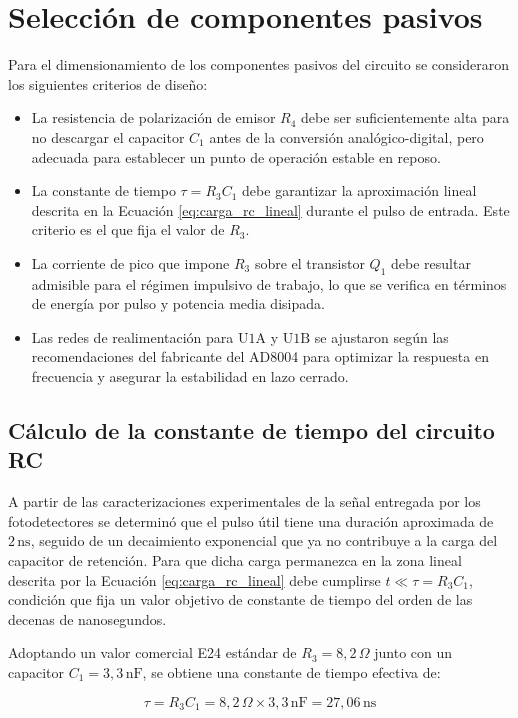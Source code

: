 \section{Selección de componentes pasivos}

Para el dimensionamiento de los componentes pasivos del circuito se consideraron los siguientes criterios de diseño:
\begin{itemize}
  \item La resistencia de polarización de emisor $R_4$ debe ser suficientemente alta para no descargar el capacitor $C_1$ antes de la conversión analógico-digital, pero adecuada para establecer un punto de operación estable en reposo.
  \item La constante de tiempo $\tau = R_3 C_1$ debe garantizar la aproximación lineal descrita en la Ecuación \ref{eq:carga_rc_lineal} durante el pulso de entrada. Este criterio es el que fija el valor de $R_3$.
  \item La corriente de pico que impone $R_3$ sobre el transistor $Q_1$ debe resultar admisible para el régimen impulsivo de trabajo, lo que se verifica en términos de energía por pulso y potencia media disipada.
  \item Las redes de realimentación para $\text{U1A}$ y $\text{U1B}$ se ajustaron según las recomendaciones del fabricante del AD8004 para optimizar la respuesta en frecuencia y asegurar la estabilidad en lazo cerrado.
\end{itemize}

\subsection{Cálculo de la constante de tiempo del circuito RC}

A partir de las caracterizaciones experimentales de la señal entregada por los fotodetectores se determinó que el pulso útil tiene una duración aproximada de $2\,\text{ns}$, seguido de un decaimiento exponencial que ya no contribuye a la carga del capacitor de retención. Para que dicha carga permanezca en la zona lineal descrita por la Ecuación \ref{eq:carga_rc_lineal} debe cumplirse $t \ll \tau = R_3 C_1$, condición que fija un valor objetivo de constante de tiempo del orden de las decenas de nanosegundos.

Adoptando un valor comercial E24 estándar de $R_3 = 8{,}2\,\Omega$ junto con un capacitor $C_1 = 3{,}3\,\text{nF}$, se obtiene una constante de tiempo efectiva de:

\begin{equation}
  \tau = R_3 C_1 = 8{,}2\,\Omega \times 3{,}3\,\text{nF} = 27{,}06\,\text{ns}
  \label{eq:tau_final}
\end{equation}

